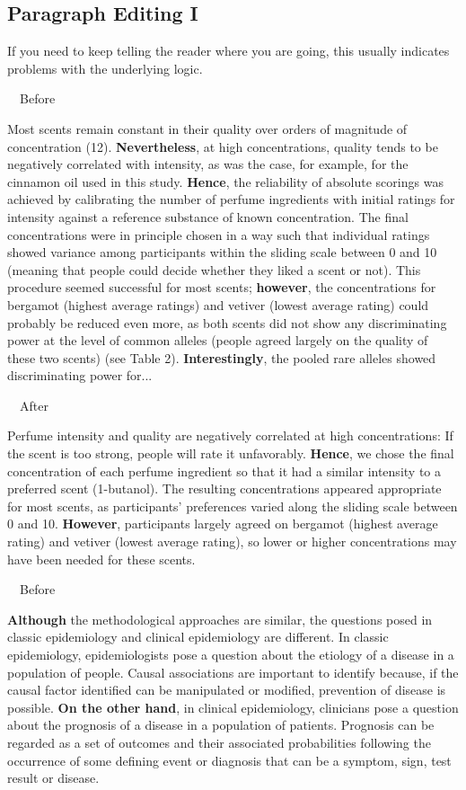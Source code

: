 \documentclass[a4paper, 12pt]{article}
\begin{document}
\newpage\subsection{Paragraph Editing I}

If you need to keep telling the reader where you are going, this usually indicates problems with the underlying logic.

\par\ \textbullet\ Before
\par Most scents remain constant in their quality over orders of magnitude of concentration (12). 
\textbf{Nevertheless}, at high concentrations, quality tends to be negatively correlated with intensity, as was the case, 
for example, for the cinnamon oil used in this study.
\textbf{Hence}, the reliability of absolute scorings was achieved by calibrating the number of perfume ingredients with initial ratings for intensity against a reference substance of known concentration. The final concentrations were in principle chosen in a way such that individual ratings showed variance among participants within the sliding scale between 0 and 10 (meaning that people could decide whether they liked a scent or not). 
This procedure seemed successful for most scents;
\textbf{however}, the concentrations for bergamot (highest average ratings) and vetiver (lowest average rating) could probably be reduced even more, as both scents did not show any discriminating power at the level of common alleles (people agreed largely on the quality of these two scents) (see Table 2). 
\textbf{Interestingly}, the pooled rare alleles showed discriminating power for...

\par\ \textbullet\ After
\par Perfume intensity and quality are negatively correlated at high concentrations:
If the scent is too strong, people will rate it unfavorably.
\textbf{Hence}, we chose the final concentration of each perfume ingredient so that it had a similar intensity to a preferred scent (1-butanol).
The resulting concentrations appeared appropriate for most scents, as participants' preferences varied along the sliding scale between 0 and 10.
\textbf{However}, participants largely agreed on bergamot (highest average rating) and vetiver (lowest average rating),
so lower or higher concentrations may have been needed for these scents.

\newpage\par\ \textbullet\ Before
\par \textbf{Although} the methodological approaches are similar, the questions posed in classic epidemiology and clinical epidemiology are different.
In classic epidemiology, epidemiologists pose a question about the etiology of a disease in a population of people.
Causal associations are important to identify because, if the causal factor identified can be manipulated or modified, prevention of disease is possible.
\textbf{On the other hand}, in clinical epidemiology, clinicians pose a question about the prognosis of a disease in a population of patients. Prognosis can be regarded as a set of outcomes and their associated probabilities following the occurrence of some defining event or diagnosis that can be a symptom, sign, test result or disease.
\end{document}
